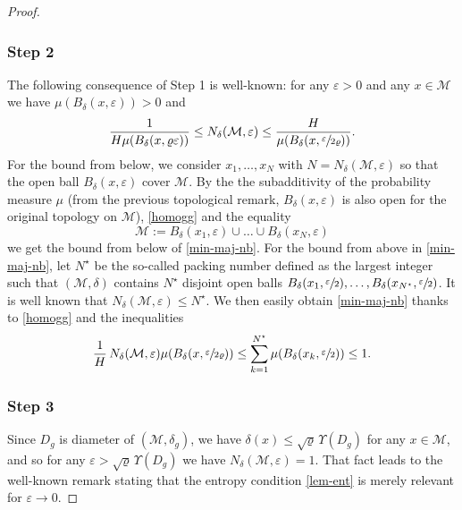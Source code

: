 \documentclass[10pt]{amsart}
\theoremstyle{theorem}
\theoremstyle{definition}
\newcommand\ep{\varepsilon}
\begin{document}
\begin{proof}
\subsubsection*{Step 2} The following consequence of Step 1 is well-known: for any $\ep>0$ and any $x\in\mathcal{M}$ we have $\mu(B_{\delta}(x,\ep))>0$ and
\begin{equation}\label{min-maj-nb}
\frac{1}{H\mu(B_\delta(x,\varrho\ep))} \leq N_\delta(\mathcal{M},\ep) \leq \frac{H}{\mu(B_\delta(x,\sfrac{\ep}{2\varrho}))}.
\end{equation}
For the bound from below, we consider $x_1,\dots,x_N$ with $N=N_\delta(\mathcal{M},\ep)$ so that the open ball $B_{\delta}(x,\ep)$ cover $\mathcal{M}$. By the the subadditivity of the probability measure $\mu$ (from the previous topological remark, $B_\delta(x,\ep)$ is also open for the original topology on $\mathcal{M}$), \eqref{homogg} and the equality
\begin{equation*}
\mathcal{M}:=B_{\delta}(x_1,\ep)\cup\dots \cup B_{\delta}(x_N,\ep)
\end{equation*}
we get the bound from below of \eqref{min-maj-nb}.
For the bound from above in \eqref{min-maj-nb}, let $N^\star$ be the so-called packing number defined as the largest integer such that $(\mathcal{M},\delta)$ contains $N^\star$ disjoint open balls $B_{\delta}(x_1,\sfrac{\ep}{2}),\dots,B_{\delta}(x_{N^\star},\sfrac{\ep}{2})$. It is well known that \hbox{$N_\delta(\mathcal{M},\ep)\leq N^\star$}. We then easily obtain \eqref{min-maj-nb} thanks to \eqref{homogg} and the inequalities
\begin{equation*}
\frac{1}{H}\, N_{\delta}(\mathcal{M},\ep) \mu(B_{\delta}(x,\sfrac{\ep}{2\varrho}))\leq \sum_{k=1}^{N^\star} \mu(B_{\delta}(x_k,\sfrac{\ep}{2})) \leq 1.
\end{equation*}

\subsubsection*{Step 3} Since $D_g$ is diameter of $(\mathcal{M},\delta_g)$, we have
$\delta(x)\leq \sqrt{\varrho}\,\Upsilon(D_g)$ for any $x\in \mathcal{M}$, and so for any $\ep>\sqrt{\varrho}\,\Upsilon(D_g)$ we have $N_\delta(\mathcal{M},\ep)=1$. That fact leads to the well-known remark stating that the entropy condition \eqref{lem-ent} is merely relevant for $\ep\to 0$.


\end{proof}
\end{document}
